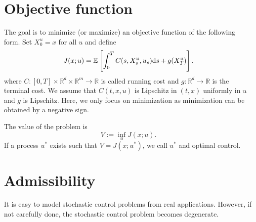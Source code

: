 \documentclass[11pt]{book}
\newcommand{\ds}{\text{\normalfont d}s}
\begin{document}
\section{Objective function}
The goal is to  minimize (or maximize) an objective function of the following form. Set $X_0^u=x$ for all $u$ and define
\begin{equation}
J(x;u)=\mathbb{E}\left[\int_0^T C(s,X_s^u,u_s){{\ds}}+g(X_T^u)\right].
\end{equation}
where $C:[0,T]\times\mathbb{R}^d\times\mathbb{R}^m\to\mathbb{R}$ is called running cost and $g:\mathbb{R}^d\to\mathbb{R}$ is the terminal cost. 
We assume that $C(t,x,u)$ is Lipschitz in $(t,x)$ uniformly in $u$ and $g$ is Lipschitz. Here, we only focus on minimization as minimization can be obtained by a negative sign. 


The value of the problem is
\begin{equation}
	V:=\inf_{u}J(x;u).
\end{equation}
If a process $u^*$ exists such that   $V=J(x;u^*)$, we call $u^*$ and optimal control. 

\section{Admissibility}
It is easy to model stochastic control problems from real applications.  However, if not carefully done, the stochastic control problem becomes degenerate.
\end{document}
